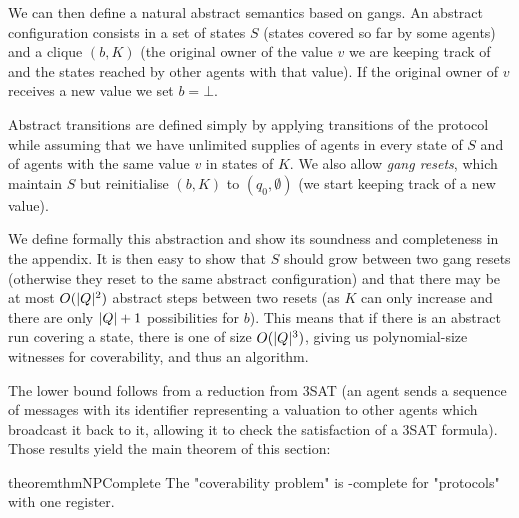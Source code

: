 %

We can then define a natural abstract semantics based on gangs. An abstract configuration consists in a set of states $S$ (states covered so far by some agents) and a clique $(b, K)$ (the original owner of the value $v$ we are keeping track of and the states reached by other agents with that value). If the original owner of $v$ receives a new value we set $b = \bot$.

Abstract transitions are defined simply by applying transitions of the protocol while assuming that we have unlimited supplies of agents in every state of $S$ and of agents with the same value $v$ in states of $K$.
We also allow \emph{gang resets}, which maintain $S$ but reinitialise $(b,K)$ to $(q_0, \emptyset)$ (we start keeping track of a new value).

We define formally this abstraction and show its soundness and completeness in the appendix.
It is then easy to show that $S$ should grow between two gang resets (otherwise they reset to the same abstract configuration) and that there may be at most $O(|Q|^2)$ abstract steps between two resets (as $K$ can only increase and there are only $|Q|+1$ possibilities for $b$). This means that if there is an abstract run covering a state, there is one of size $O(|Q|^3)$, giving us polynomial-size witnesses for coverability, and thus an \NP algorithm.

The \NP lower bound follows from a reduction from 3SAT (an agent sends a sequence of messages with its identifier representing a valuation to other agents which broadcast it back to it, allowing it to check the satisfaction of a 3SAT formula).
Those results yield the main theorem of this section:


\begin{restatable}{theorem}{thmNPComplete}
	\label{thm:np-complete-query-cover}
	The "coverability problem" is \NP-complete for "protocols" with one register.
\end{restatable}

